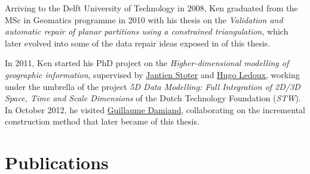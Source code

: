 Arriving to the Delft University of Technology in 2008, Ken graduated from the MSc in Geomatics programme in 2010 with his thesis on the \emph{Validation and automatic repair of planar partitions using a constrained triangulation}, which later evolved into some of the data repair ideas exposed in  of this thesis.

In 2011, Ken started his PhD project on the \emph{Higher-dimensional modelling of geographic information}, supervised by \href{https://3d.bk.tudelft.nl/jstoter/}{Jantien Stoter} and \href{http://tudelft.nl/hledoux}{Hugo Ledoux}, working under the umbrella of the project \emph{5D Data Modelling: Full Integration of 2D/3D Space, Time and Scale Dimensions} of the Dutch Technology Foundation (\emph{STW}).
In October 2012, he visited \href{http://liris.cnrs.fr/guillaume.damiand/}{Guillaume Damiand}, collaborating on the incremental construction method that later became  of this thesis.


\clearpage
\section*{Publications}

{\small
\begin{itemize}
\paperijgisroeland%
\paperudmvobj%
\paperisprsnd%
\paperijgind{}%
\paperijgisextrusion{}%
\paperijgisndstructures{}%
\papercgeoprepair{}%
\papericaaincrementalconstruction{}%
\paperacmsigspatialextrusion%
\papericcsand%
\clearpage%
\papergeoadvancesnd{}%
\paperagileslicing%
\paperpfgpprepair{}%
\paperosgisrepair%
\papertdgeoinfond%
\paperagileprepair%
\paperostravaedgematching%
\end{itemize}
}

